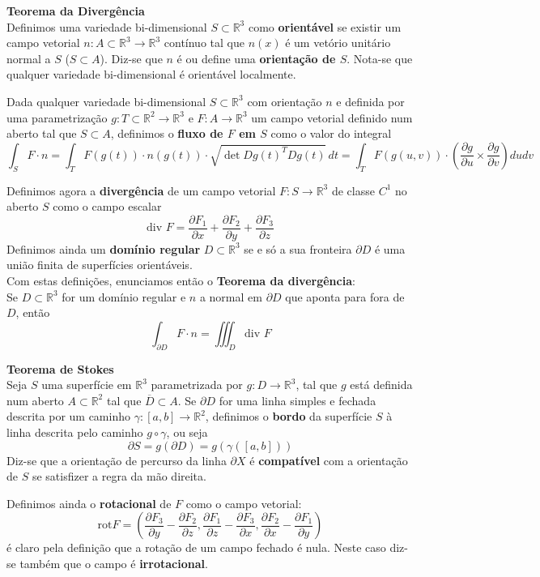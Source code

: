 \documentclass{article}
\newcommand{\R}{\mathbb{R}}
\begin{document}
\textbf{Teorema da Divergência}\\
Definimos uma variedade bi-dimensional $S \subset \R^3$ como \textbf{orientável} se existir um campo vetorial $n: A \subset \R^3 \to \R^3$ contínuo tal que $n(x)$ é um vetório unitário normal a $S$ ($S \subset A$). Diz-se que $n$ é ou define uma \textbf{orientação de $S$}. Nota-se que qualquer variedade bi-dimensional é orientável localmente.

Dada qualquer variedade bi-dimensional $S \subset \R^3$ com orientação $n$ e definida por uma parametrização $g:T \subset \R^2 \to \R^3$ e $F: A \to \R^3$ um campo vetorial definido num aberto tal que $S \subset A$, definimos o \textbf{fluxo de $F$ em $S$} como o valor do integral
$$ \int_S F \cdot n 
= \int_T F(g(t)) \cdot n(g(t)) \cdot \sqrt{\det Dg(t)^T Dg(t)} \, dt 
= \int_T F(g(u,v)) \cdot \left( \frac{\partial g}{\partial u} \times 
\frac{\partial g}{\partial v} \right) du dv$$

Definimos agora a \textbf{divergência} de um campo vetorial $F: S \to \R^3$ de classe $C^1$ no aberto $S$ como o campo escalar
$$ \text{div } F = \frac{\partial F_1}{\partial x} + \frac{\partial F_2}{\partial y} + \frac{\partial F_3}{\partial z} $$
Definimos ainda um \textbf{domínio regular} $D \subset \R^3$ se e só a sua fronteira $\partial D$ é uma união finita de superfícies orientáveis.\\
Com estas definições, enunciamos então o \textbf{Teorema da divergência}:\\
Se $D \subset \R^3$ for um domínio regular e $n$ a normal em $\partial D$ que aponta para fora de $D$, então
$$ \int_{\partial D} F \cdot n = \iiint_D \text{div } F $$

\textbf{Teorema de Stokes}\\
Seja $S$ uma superfície em $\R^3$ parametrizada por $g: D \to \R^3$, tal que $g$ está definida num aberto $A \subset \R^2$ tal que $\overline{D} \subset A$. Se $\partial D$ for uma linha simples e fechada descrita por um caminho $\gamma: [a,b] \to \R^2$, definimos o \textbf{bordo} da superfície $S$ à linha descrita pelo caminho $g \circ \gamma$, ou seja
$$ \partial S = g(\partial D) = g(\gamma([a,b])) $$
Diz-se que a orientação de percurso da linha $\partial X$ é \textbf{compatível} com a orientação de $S$ se satisfizer a regra da mão direita.

Definimos ainda o \textbf{rotacional} de $F$ como o campo vetorial:
$$ \text{rot} F = \left( 
\frac{\partial F_3}{\partial y} - \frac{\partial F_2}{\partial z},
\frac{\partial F_1}{\partial z} - \frac{\partial F_3}{\partial x},
\frac{\partial F_2}{\partial x} - \frac{\partial F_1}{\partial y} 
\right) $$
é claro pela definição que a rotação de um campo fechado é nula. Neste caso diz-se também que o campo é \textbf{irrotacional}.
\end{document}
